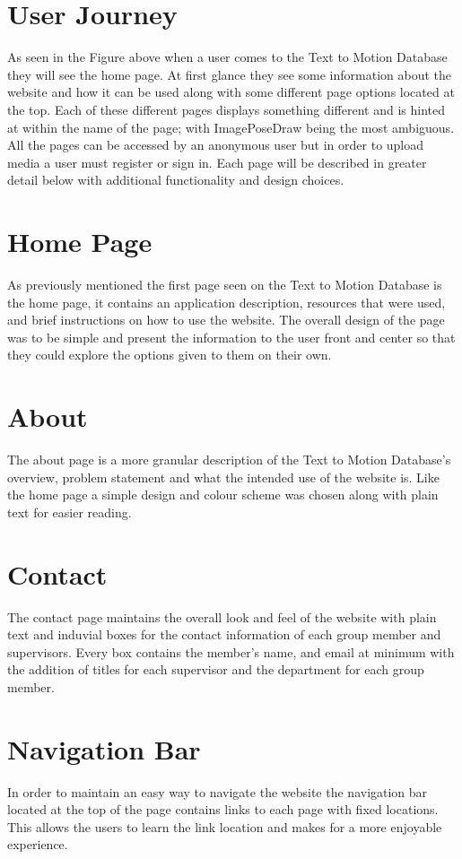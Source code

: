\documentclass{scrreprt}
\begin{document}
\section{User Journey}
As seen in the Figure above when a user comes to the Text to Motion Database they will see the home page. At first glance they see some information about the website and how it can be used along with some different page options located at the top. Each of these different pages displays something different and is hinted at within the name of the page; with ImagePoseDraw being the most ambiguous. All the pages can be accessed by an anonymous user but in order to upload media a user must register or sign in. Each page will be described in greater detail below with additional functionality and design choices.

\section{Home Page}
As previously mentioned the first page seen on the Text to Motion Database is the home page, it contains an application description, resources that were used, and brief instructions on how to use the website. The overall design of the page was to be simple and present the information to the user front and center so that they could explore the options given to them on their own.

\section{About}
The about page is a more granular description of the Text to Motion Database’s overview, problem statement and what the intended use of the website is. Like the home page a simple design and colour scheme was chosen along with plain text for easier reading.

\section{Contact}
The contact page maintains the overall look and feel of the website with plain text and induvial boxes for the contact information of each group member and supervisors. Every box contains the member’s name, and email at minimum with the addition of titles for each supervisor and the department for each group member.

\section{Navigation Bar}
In order to maintain an easy way to navigate the website the navigation bar located at the top of the page contains links to each page with fixed locations. This allows the users to learn the link location and makes for a more enjoyable experience.
\end{document}
